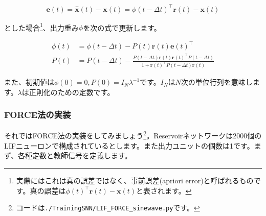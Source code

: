 \begin{equation}
\boldsymbol{e}(t)=\hat{\boldsymbol{x}}(t)-\boldsymbol{x}(t)=\phi(t-\Delta t)^\intercal \boldsymbol{r}(t)-\boldsymbol{x}(t)    
\end{equation}


とした場合\footnote{実際にはこれは真の誤差ではなく、事前誤差(apriori error)と呼ばれるものです。真の誤差は$\phi(t)^\intercal \boldsymbol{r}(t)-\boldsymbol{x}(t)$と表されます。}、出力重み$\phi$を次の式で更新します。


\begin{align}
\phi(t)&=\phi(t-\Delta t)-P(t) \boldsymbol{r}(t)\boldsymbol{e}(t)^\intercal\\
P(t)&=P(t-\Delta t)-\frac{P(t-\Delta t) \boldsymbol{r}(t) \boldsymbol{r}(t)^\intercal P(t-\Delta t)}{1+\boldsymbol{r}(t)^\intercal P(t-\Delta
t) \boldsymbol{r}(t)} 
\end{align}


また、初期値は$\phi(0)=0,
P(0)=I_{N}\lambda^{-1}$です。$I_{N}$は$N$次の単位行列を意味します。$\lambda$は正則化のための定数です。

\subsubsection{FORCE法の実装}
それではFORCE法の実装をしてみましょう\footnote{コードは\texttt{./TrainingSNN/LIF\_FORCE\_sinewave.py}です。}。Reservoirネットワークは2000個のLIFニューロンで構成されているとします。また出力ユニットの個数は1です。まず、各種定数と教師信号を定義します。
